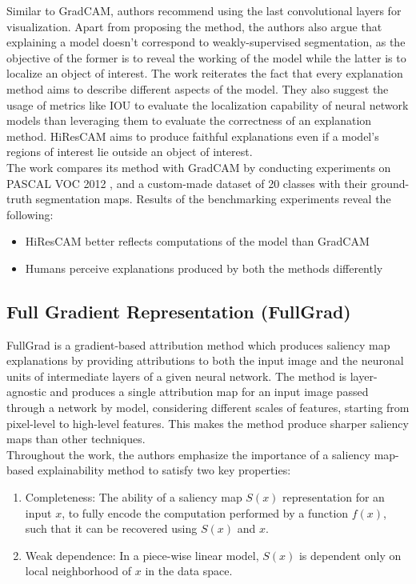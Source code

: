 \documentclass[../report.tex]{subfiles}
\begin{document}
	Similar to GradCAM, authors recommend using the last convolutional layers for visualization. Apart from proposing the method, the authors also argue that explaining a model doesn’t correspond to weakly-supervised segmentation, as the objective of the former is to reveal the working of the model while the latter is to localize an object of interest. The work reiterates the fact that every explanation method aims to describe different aspects of the model. They also suggest the usage of metrics like IOU to evaluate the localization capability of neural network models than leveraging them to evaluate the correctness of an explanation method. HiResCAM aims to produce faithful explanations even if a model’s regions of interest lie outside an object of interest.\\
	The work compares its method with GradCAM by conducting experiments on PASCAL VOC 2012 \cite{pascal-voc-2012},  and a custom-made dataset of 20 classes with their ground-truth segmentation maps. Results of the benchmarking experiments reveal the following:
	\begin{itemize}
		\item HiResCAM better reflects computations of the model than GradCAM
		\item Humans perceive explanations produced by both the methods differently
	\end{itemize}
	
	
\subsection{Full Gradient Representation (FullGrad)}
\noindent
FullGrad \cite{srinivas2019full} is a gradient-based attribution method which produces saliency map explanations by providing attributions to both the input image and the neuronal units of intermediate layers of a given neural network. The method is layer-agnostic and produces a single attribution map for an input image passed through a network by model, considering different scales of features, starting from pixel-level to high-level features. This makes the method produce sharper saliency maps than other techniques.\\
Throughout the work, the authors emphasize the importance of a saliency map-based explainability method to satisfy two key properties: 
\begin{enumerate}
	\item Completeness: The ability of a saliency map $S(x)$ representation for an input $x$, to fully encode the computation performed by a function $f(x)$, such that it can be recovered using $S(x)$ and $x$.
	\item Weak dependence: In a piece-wise linear model, $S(x)$ is dependent only on local neighborhood of $x$ in the data space. 
\end{enumerate}
\end{document}
